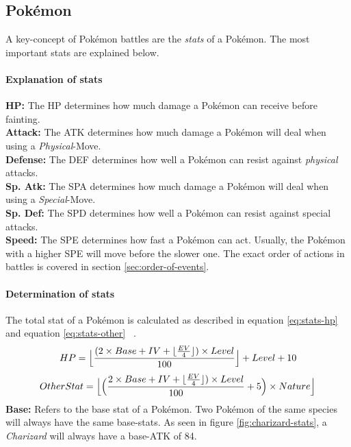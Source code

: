 \subsection{Pokémon}
\label{sec:pokemon}
A key-concept of Pokémon battles are the \textit{stats} of a Pokémon. The most important stats
are explained below. 
\paragraph{Explanation of stats}
\textbf{HP:} The \ac{HP} determines how much damage a Pokémon can receive before fainting. \\
\textbf{Attack:} The \ac{ATK} determines how much damage a Pokémon will deal when using 
a \textit{Physical}-Move. \\
\textbf{Defense:} The \ac{DEF} determines how well a Pokémon can resist against \textit{physical} attacks. \\
\textbf{Sp. Atk:} The \ac{SPA} determines how much damage a Pokémon will deal when using
a \textit{Special}-Move. \\
\textbf{Sp. Def:} The \ac{SPD} determines how well a Pokémon can resist against special attacks. \\
\textbf{Speed:} The \ac{SPE} determines how fast a Pokémon can act. Usually, the Pokémon with a higher
\ac{SPE} will move before the slower one. The exact order of actions in battles is covered in section
\ref{sec:order-of-events}.

\paragraph{Determination of stats}
\label{sec:stat-calculation}
The total stat of a Pokémon is calculated as described in equation \ref{eq:stats-hp} and equation 
\ref{eq:stats-other} ~\autocite{Bulbapedia:Stat}.
\begin{equation}
	\label{eq:stats-hp}
	HP = \Bigl\lfloor \frac{(2 \times Base + IV + \lfloor \frac{EV}{4} \rfloor) \times Level}{100}\Bigr\rfloor
	+ Level + 10 \\
\end{equation}
\begin{equation}
	\label{eq:stats-other}
	OtherStat = \Bigl\lfloor \Big( \frac{2 \times Base + IV + \lfloor \frac{EV}{4} \rfloor) \times Level}
	{100} + 5\Big) \times Nature \Bigr\rfloor
\end{equation}
\textbf{Base:} Refers to the base stat of a Pokémon. Two Pokémon of the same species will always have the 
same base-stats. As seen in figure \ref{fig:charizard-stats}, a \textit{Charizard} will always have a
base-\ac{ATK} of 84.

